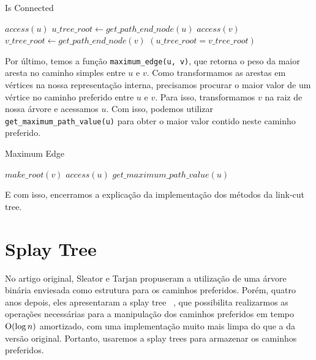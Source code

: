 \begin{algorithm}[h!]
    \caption{Is Connected}\label{lct:is-connected}
    \begin{algorithmic}
        \State $access(u)$
        \State $u\_tree\_root \gets get\_path\_end\_node(u)$
        \State $access(v)$
        \State $v\_tree\_root \gets get\_path\_end\_node(v)$
        \State \Return $(u\_tree\_root = v\_tree\_root)$
        \EndFunction
    \end{algorithmic}
\end{algorithm}

Por último, temos a função \texttt{maximum\_edge(u, v)}, que retorna o peso da maior aresta no caminho simples entre $u$ e $v$. Como transformamos as arestas em vértices na nossa representação interna, precisamos procurar o maior valor de um vértice no caminho preferido entre $u$ e $v$. Para isso, transformamos $v$ na raiz de nossa árvore e acessamos $u$. Com isso, podemos utilizar \texttt{get\_maximum\_path\_value(u)} para obter o maior valor contido neste caminho preferido.

\begin{algorithm}[h!]
    \caption{Maximum Edge}\label{lct:max-edge}
    \begin{algorithmic}
        \State $make\_root(v)$
        \State $access(u)$
        \State \Return $get\_maximum\_path\_value(u)$
        \EndFunction
    \end{algorithmic}
\end{algorithm}

E com isso, encerramos a explicação da implementação dos métodos da link-cut tree.

\section{Splay Tree}
\label{sec:lct-splay-trees}

No artigo original, Sleator e Tarjan propuseram a utilização de uma árvore binária enviesada como estrutura para os caminhos preferidos. Porém, quatro anos depois, eles apresentaram a splay tree ~\citep{10.1145/3828.3835}, que possibilita realizarmos as operações necessárias para a manipulação dos caminhos preferidos em tempo $\mathrm{O}(\log n)$ amortizado, com uma implementação muito mais limpa do que a da versão original. Portanto, usaremos a splay trees para armazenar os caminhos preferidos.

